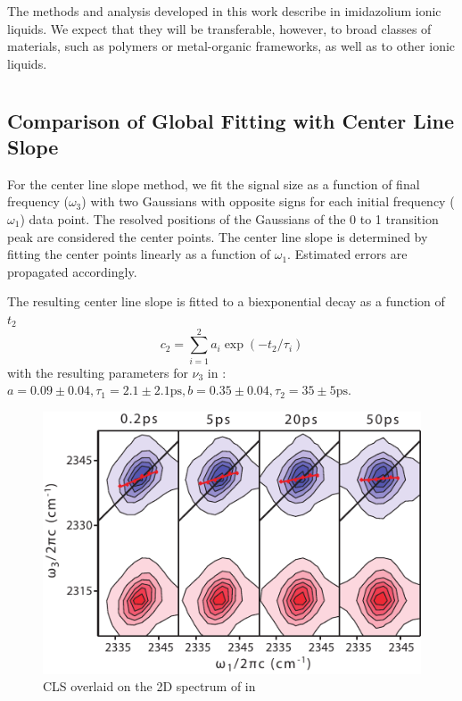 {The methods and analysis developed in this work describe  in imidazolium ionic liquids. We expect that they will be transferable, however, to broad classes of materials, such as polymers or metal-organic frameworks, as well as to other ionic liquids.

\section{\texorpdfstring{}{Supporting Information}}
\label{paper_01:sec:SI}

\subsection{Comparison of Global Fitting with Center Line Slope}
\label{anionSI_CLS}

For the center line slope method, we fit the signal size as a function of final frequency (\(\omega_3\)) with two Gaussians with opposite signs for each initial frequency (\(\omega_1\)) data point. The resolved positions of the Gaussians of the 0 to 1 transition peak are considered the center points. The center line slope is determined by  fitting the center points linearly as a function of \(\omega_1\). Estimated errors are propagated accordingly.

The resulting center line slope is fitted to a biexponential decay as a function of \(t_2\)
\begin{equation}
c_2 = \sum_{i=1}^2 a_i \exp{\left( -t_2/\tau_i \right)}
\end{equation}
with the resulting parameters for  \(\nu_3\) in \ce{[Im_{4,1}][TFA]}: \(a = 0.09 \pm 0.04, \tau_1 = 2.1 \pm 2.1 \si{\ps}, b = 0.35 \pm 0.04, \tau_2 = 35 \pm 5 \si{\ps}\).

\begin{figure}[h]
  \centering
  \includegraphics[scale=0.8]{./paper_01/CLS_BMIMTFA.pdf}
  \caption{CLS overlaid on the 2D spectrum of  in \ce{[Im_{4,1}][TFA]}}
\end{figure}

}
